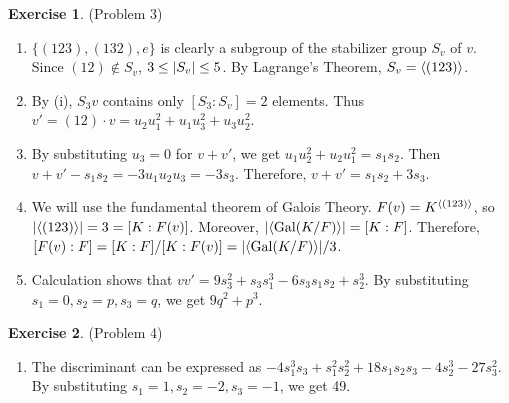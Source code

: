 \documentclass[12pt, psamsfonts]{amsart}
\theoremstyle{definition}
\newtheorem*{exer}{Exercise}
\theoremstyle{remark}
\DeclareMathOperator{\Gal}{Gal}
\numberwithin{equation}{section}
\begin{document}
\begin{exer}{(Problem 3)}
  \begin{enumerate}[label=(\alph*)]
    \item
      $\{ (123), (132), e \}$ is clearly a subgroup of the stabilizer group $S_v$ of $v$.
      Since $(12) \notin S_v$, $3 \leq \abs{S_v} \leq 5$.
      By Lagrange's Theorem, $S_v = \ev{(123)}$. 
    \item
      By (i), $S_3v$ contains only $[S_3:S_v] = 2$ elements.
      Thus $v' = (12) \cdot v = u_2u_1^2 + u_1u_3^2 + u_3u_2^2$.
    \item
      By substituting $u_3 = 0$ for $v + v'$, we get $u_1u_2^2 + u_2u_1^2 = s_1s_2$.
      Then $v + v' - s_1s_2 = -3u_1u_2u_3 = -3s_3$.
      Therefore, $v + v' = s_1s_2 + 3s_3$.
    \item
      We will use the fundamental theorem of Galois Theory.
      $F(v) = K^{\ev{(123)}}$, so $\abs{\ev{(123)}} = 3 = [K:F(v)]$.
      Moreover, $\abs{\ev{\Gal(K/F)}} = [K:F]$.
      Therefore, $[F(v):F] = [K:F]/[K:F(v)] = \abs{\ev{\Gal(K/F)}}/3$.
    \item
      Calculation shows that $vv' = 9s_3^2 + s_3s_1^3 - 6s_3s_1s_2 + s_2^3$.
      By substituting $s_1 = 0, s_2 = p, s_3 = q$, we get $9q^2 + p^3$.
  \end{enumerate}
\end{exer}

\begin{exer}{(Problem 4)}
  \begin{enumerate}[label=(\alph*)]
    \item 
      The discriminant can be expressed as $-4s_{1}^{3}s_{3}+s_{1}^{2}s_{2}^{2}+18s_{1}s_{2}s_{3}-4s_{2}^{3}-27s_{3}^{2}$.
      By substituting $s_1 = 1, s_2 = -2, s_3 = -1$, we get 49.
      

  \end{enumerate}
\end{exer}
\end{document}
